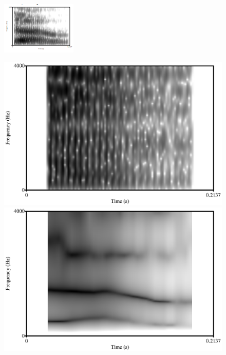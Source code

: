 \documentclass{beamer}
\begin{document}
\begin{frame}
\centering
\begin{figure}
\includegraphics[scale=0.9,keepaspectratio]{original_vowel.png}
\end{figure}
\begin{figure}
\includegraphics[scale=0.3,keepaspectratio]{source.eps}
\includegraphics[scale=0.3,keepaspectratio]{LPC_filter.eps}
\end{figure}
\end{frame}
\end{document}
